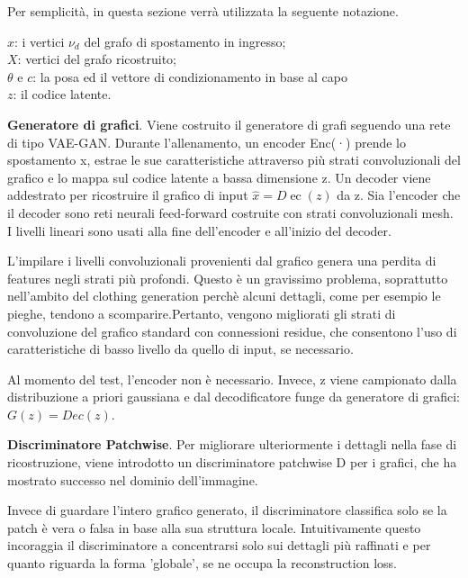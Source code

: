 Per semplicità, in questa sezione verrà utilizzata la seguente notazione.

\medskip

$x$: i vertici $\nu_d$ del grafo di spostamento in ingresso; \\
$X$: vertici del grafo ricostruito;\\
$\theta$ e $c$: la posa ed il
vettore di condizionamento in base al capo\\
$z$: il codice latente.

\medskip

\textbf{Generatore di grafici}. Viene costruito il generatore di grafi seguendo una rete di tipo VAE-GAN. Durante l'allenamento, un encoder Enc(·)
prende lo spostamento x, estrae le sue caratteristiche attraverso più strati convoluzionali del grafico e lo mappa sul codice latente a bassa dimensione z. Un decoder viene addestrato per ricostruire il grafico di input $\hat{x}=D \operatorname{ec}(z)$ da z. Sia l'encoder che il decoder sono reti neurali feed-forward costruite
con strati convoluzionali mesh. I livelli lineari sono usati alla fine dell'encoder e all'inizio del decoder.

\medskip

L'impilare i livelli convoluzionali provenienti dal grafico genera una perdita di features negli strati più profondi. Questo è un gravissimo problema, soprattutto nell'ambito del clothing generation perchè alcuni dettagli, come per esempio le pieghe, tendono a scomparire.Pertanto, vengono migliorati gli strati di convoluzione del grafico standard con connessioni residue, che consentono l'uso di caratteristiche di basso livello da quello di input, se necessario.

\medskip

Al momento del test, l'encoder non è necessario. Invece, z viene campionato dalla distribuzione a priori gaussiana e dal decodificatore
funge da generatore di grafici: $G(z) = Dec(z)$.

\medskip

\textbf{Discriminatore Patchwise}. Per migliorare ulteriormente i dettagli nella fase di ricostruzione, viene introdotto un discriminatore patchwise D per i grafici, che ha mostrato successo nel dominio dell'immagine.

Invece di guardare l'intero grafico generato, il discriminatore classifica solo se la patch è vera o falsa in base alla sua struttura locale. Intuitivamente questo incoraggia il discriminatore a concentrarsi solo sui
dettagli più raffinati e per quanto riguarda la forma 'globale', se ne occupa la reconstruction loss.

